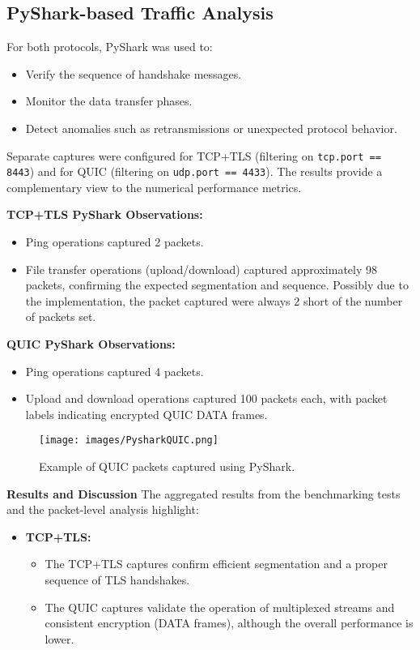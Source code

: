 \subsection{PyShark-based Traffic Analysis}
For both protocols, PyShark was used to:
\begin{itemize}
    \item Verify the sequence of handshake messages.
    \item Monitor the data transfer phases.
    \item Detect anomalies such as retransmissions or unexpected protocol behavior.
\end{itemize}
Separate captures were configured for TCP+TLS (filtering on \texttt{tcp.port == 8443}) and for QUIC (filtering on \texttt{udp.port == 4433}). The results provide a complementary view to the numerical performance metrics.
\newline

\textbf{TCP+TLS PyShark Observations:}
\begin{itemize}
    \item Ping operations captured 2 packets.
    \item File transfer operations (upload/download) captured approximately 98 packets, confirming the expected segmentation and sequence. Possibly due to the implementation, the packet captured were always 2 short of the number of packets set.
\end{itemize}

\textbf{QUIC PyShark Observations:}
\begin{itemize}
    \item Ping operations captured 4 packets.
    \item Upload and download operations captured 100 packets each, with packet labels indicating encrypted QUIC DATA frames.
\end{itemize}

\begin{figure}[h]
	\centering
	\texttt{[image: images/PysharkQUIC.png]}
	\caption{Example of QUIC packets captured using PyShark.}
\end{figure}

\noindent \textbf{Results and Discussion} \newline
The aggregated results from the benchmarking tests and the packet-level analysis highlight:
\begin{itemize}
    \item \textbf{TCP+TLS:}  
    \begin{itemize}        
        \item The TCP+TLS captures confirm efficient segmentation and a proper sequence of TLS handshakes.
        \item The QUIC captures validate the operation of multiplexed streams and consistent encryption (DATA frames), although the overall performance is lower.
    \end{itemize}
\end{itemize}